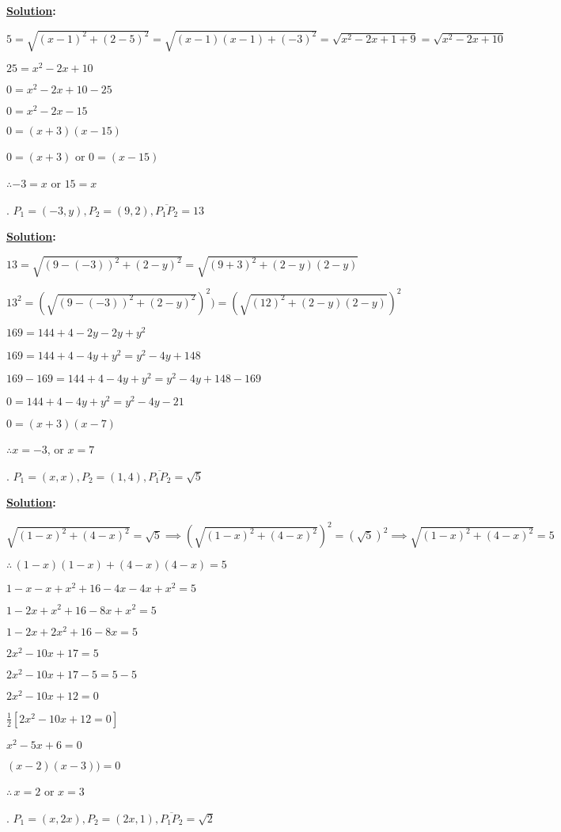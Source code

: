 \documentclass[10pt,letterpaper]{article}
\begin{document}
\smallskip
\textbf{\underline {Solution}:}
\smallskip

$5=\sqrt{(x-1)^2+(2-5)^2}=\sqrt{(x-1)(x-1)+(-3)^2}=\sqrt{x^2-2x+1+9}=\sqrt{x^2-2x+10}$

$25=x^2-2x+10$

$0=x^2-2x+10-25$

$0=x^2-2x-15$

$0=(x+3)(x-15)$

$0=(x+3)$ or $0=(x-15)$

$\therefore -3=x$ or $15=x$

. $P_{1} = (-3, y), P_{2} = (9, 2), \overline{P_1P_2 }= 13$

\smallskip
\textbf{\underline {Solution}:}
\smallskip

$13=\sqrt{(9-(-3))^2+(2-y)^2} = \sqrt{(9+3)^2+(2-y)(2-y)}$

$13^2=(\sqrt{(9-(-3))^2+(2-y)^2})^2) = (\sqrt{(12)^2+(2-y)(2-y)})^2$

$169=144+4-2y-2y+y^2$

$169=144+4-4y+y^2=y^2-4y+148$

$169-169=144+4-4y+y^2=y^2-4y+148-169$

$0=144+4-4y+y^2=y^2-4y-21$

$0=(x+3)(x-7)$

$\therefore x=-3$, or $x=7$

. $P_{1} = (x, x), P_{2} = (1, 4), \overline{P_1P_2} = \sqrt{5}$

\smallskip
\textbf{\underline {Solution}:}\\
\smallskip

$\sqrt{(1-x)^2+(4-x)^2}=\sqrt{5} \implies (\sqrt{(1-x)^2+(4-x)^2})^2=(\sqrt{5})^2 \implies \sqrt{(1-x)^2+(4-x)^2}=5$

$\therefore\,(1-x)(1-x)+(4-x)(4-x)=5$

$1-x-x+x^2+16-4x-4x+x^2=5$

$1-2x+x^2+16-8x+x^2=5$

$1-2x+2x^2+16-8x=5$

$2x^2-10x+17=5$

$2x^2-10x+17-5=5-5$

$2x^2-10x+12=0$

$\frac{1}{2}[2x^2-10x+12=0]$

$x^2-5x+6=0$

$(x-2)(x-3))=0$

$\therefore\,x=2$ or $x=3$

. $P_{1} = (x, 2x), P_{2} = (2x, 1), \overline{P_1P_2} = \sqrt{2}$
\end{document}
